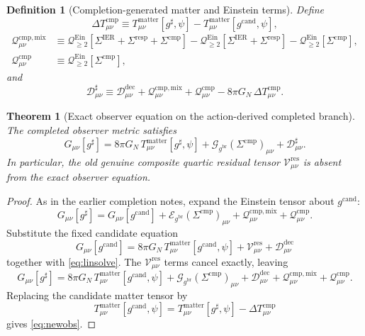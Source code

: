 \documentclass[11pt]{article}
\newcommand{\ObserverMetric}{g^{\mathrm{br}}}
\newcommand{\CandidateMetric}{g^{\mathrm{cand}}}
\newcommand{\CompletedMetric}{g^{\sharp}}
\newcommand{\BaseShift}{\Sigma^{\mathrm{IER}}}
\newcommand{\ResponseShift}{\Sigma^{\mathrm{resp}}}
\newcommand{\CompShift}{\Sigma^{\mathrm{cmp}}}
\newcommand{\ResidualCore}{\mathcal V_{\mu\nu}^{\mathrm{res}}}
\newcommand{\ResidualDec}{\mathcal D_{\mu\nu}^{\mathrm{dec}}}
\newcommand{\GaugeBook}{\mathcal G_{\ObserverMetric}}
\newcommand{\EinLin}{\mathcal E_{\ObserverMetric}}
\newcommand{\EinQuad}{\mathcal Q_{\ge 2}^{\mathrm{Ein}}}
\newcommand{\CompMix}{\mathcal Q_{\mu\nu}^{\mathrm{cmp,mix}}}
\newcommand{\CompQuad}{\mathcal Q_{\mu\nu}^{\mathrm{cmp}}}
\newcommand{\CompDec}{\mathcal D_{\mu\nu}^{\sharp}}
\newcommand{\DeltaTComp}{\Delta T_{\mu\nu}^{\mathrm{cmp}}}
\newtheorem{definition}{Definition}
\newtheorem{theorem}{Theorem}
\begin{document}
\begin{definition}[Completion-generated matter and Einstein terms]
\label{def:extra}
Define
\begin{equation}
\DeltaTComp
\equiv
T_{\mu\nu}^{\mathrm{matter}}[\CompletedMetric,\psi]
-T_{\mu\nu}^{\mathrm{matter}}[\CandidateMetric,\psi],
\label{eq:deltatcomp}
\end{equation}
\begin{align}
\CompMix
&\equiv
\EinQuad[\BaseShift+\ResponseShift+\CompShift]
-\EinQuad[\BaseShift+\ResponseShift]
-\EinQuad[\CompShift],
\label{eq:compmix}
\\
\CompQuad
&\equiv
\EinQuad[\CompShift],
\label{eq:compquad}
\end{align}
and
\begin{equation}
\CompDec
\equiv
\ResidualDec+\CompMix+\CompQuad-8\pi G_N\,\DeltaTComp.
\label{eq:compdec}
\end{equation}
\end{definition}

\begin{theorem}[Exact observer equation on the action-derived completed branch]
\label{thm:obs}
The completed observer metric satisfies
\begin{equation}
G_{\mu\nu}[\CompletedMetric]
=
8\pi G_N\,T_{\mu\nu}^{\mathrm{matter}}[\CompletedMetric,\psi]
+\GaugeBook(\CompShift)_{\mu\nu}
+\CompDec.
\label{eq:newobs}
\end{equation}
In particular, the old genuine composite quartic residual tensor \(\ResidualCore\) is absent from the exact observer equation.
\end{theorem}

\begin{proof}
As in the earlier completion notes, expand the Einstein tensor about \(\CandidateMetric\):
\begin{equation}
G_{\mu\nu}[\CompletedMetric]
=
G_{\mu\nu}[\CandidateMetric]
+\EinLin(\CompShift)_{\mu\nu}
+\CompMix+\CompQuad.
\label{eq:expand}
\end{equation}
Substitute the fixed candidate equation
\[
G_{\mu\nu}[\CandidateMetric]
=
8\pi G_N\,T_{\mu\nu}^{\mathrm{matter}}[\CandidateMetric,\psi]
+\ResidualCore+\ResidualDec
\]
together with \eqref{eq:linsolve}. The \(\ResidualCore\) terms cancel exactly, leaving
\[
G_{\mu\nu}[\CompletedMetric]
=
8\pi G_N\,T_{\mu\nu}^{\mathrm{matter}}[\CandidateMetric,\psi]
+\GaugeBook(\CompShift)_{\mu\nu}
+\ResidualDec+\CompMix+\CompQuad.
\]
Replacing the candidate matter tensor by
\[
T_{\mu\nu}^{\mathrm{matter}}[\CandidateMetric,\psi]
=
T_{\mu\nu}^{\mathrm{matter}}[\CompletedMetric,\psi]-\DeltaTComp
\]
gives \eqref{eq:newobs}.
\end{proof}
\end{document}
